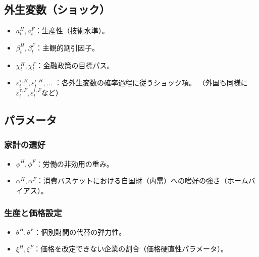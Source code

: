 \subsection*{外生変数（ショック）}
\label{sec:chapter3_definitions_variables_exogenous}
\begin{itemize}
    \item
    \label{itm:chapter3_definitions_variables_exogenous_a}
        \(a_t^H,a_t^F\)：生産性（技術水準）。
    \item
    \label{itm:chapter3_definitions_variables_exogenous_beta}
        \(\beta_t^H,\beta_t^F\)：主観的割引因子。
    \item
    \label{itm:chapter3_definitions_variables_exogenous_chi}
        \(\chi_t^H,\chi_t^F\)：金融政策の目標パス。
    \item
    \label{itm:chapter3_definitions_variables_exogenous_eps}
        \(\varepsilon_t^{\tau,H},\varepsilon_t^{i,H},\dots\)
        ：各外生変数の確率過程に従うショック項。
        （外国も同様に\(\varepsilon_t^{\tau,F},\varepsilon_t^{i,F}\)など）
\end{itemize}

\subsection*{パラメータ}
\label{sec:chapter3_definitions_variables_parameters}

\subsubsection*{家計の選好}
\label{sec:chapter3_definitions_variables_parameters_preferences}
\begin{itemize}
    \item
    \label{itm:chapter3_definitions_variables_parameters_preferences_phi}
        \(\phi^H,\phi^F\)：労働の非効用の重み。
    \item
    \label{itm:chapter3_definitions_variables_parameters_preferences_alpha}
        \(\alpha^H,\alpha^F\)：消費バスケットにおける自国財（内需）への嗜好の強さ（ホームバイアス）。
\end{itemize}

\subsubsection*{生産と価格設定}
\label{sec:chapter3_definitions_variables_parameters_production}
\begin{itemize}
    \item
    \label{itm:chapter3_definitions_variables_parameters_production_theta}
        \(\theta^H,\theta^F\)：個別財間の代替の弾力性。
    \item
    \label{itm:chapter3_definitions_variables_parameters_production_xi}
        \(\xi^H,\xi^F\)：価格を改定できない企業の割合（価格硬直性パラメータ）。
\end{itemize}

